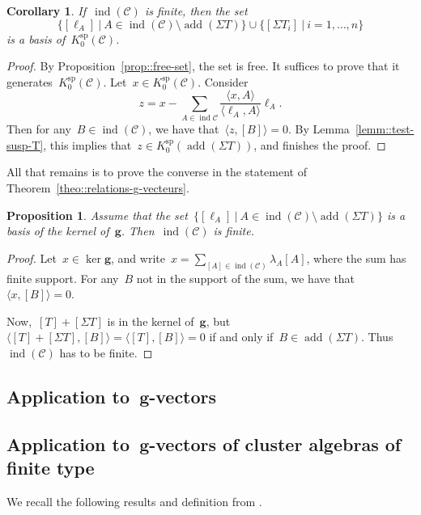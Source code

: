 \documentclass{amsart}
\newtheorem{corollary}[theorem]{Corollary}
\newtheorem{proposition}[theorem]{Proposition}
\theoremstyle{definition}
\renewcommand{\b}[1]{{\boldsymbol{#1}}} %
\newcommand{\cat}{\mathcal{C}}
\newcommand{\susp}{\Sigma}
\newcommand{\add}{\operatorname{add}}
\newcommand{\spl}{\operatorname{sp}}
\newcommand{\Ksp}{K_0^{\spl}}
\newcommand{\ind}{\operatorname{ind}}
\begin{document}
\begin{corollary}
 If~$\ind(\cat)$ is finite, then the set~\[\{[\ell_A] \ | \ A\in \ind(\cat) \setminus \add(\susp T) \} \cup \{[\susp T_i] \ | \ i=1, \ldots, n\}\] is a basis of~$\Ksp(\cat)$.
\end{corollary}
\begin{proof}
 By Proposition~\ref{prop::free-set}, the set is free.  It suffices to prove that it generates~$\Ksp(\cat)$.  Let~$x\in \Ksp(\cat)$.  Consider
 \[
  z = x - \sum_{A\in \ind{\cat}} \frac{\langle x, A \rangle}{\langle \ell_A, A\rangle} \ell_A.
 \]
 Then for any~$B\in \ind(\cat)$, we have that~$\langle z, [B] \rangle = 0$.  By Lemma~\ref{lemm::test-susp-T}, this implies that~$z\in \Ksp(\add(\susp T))$, and finishes the proof.
\end{proof}


All that remains is to prove the converse in the statement of Theorem~\ref{theo::relations-g-vecteurs}.

\begin{proposition}
 Assume that the set~$\{[\ell_A] \ | \ A\in \ind(\cat) \setminus \add(\susp T) \}$ is a basis of the kernel of~$\b g$. Then~$\ind(\cat)$ is finite.
\end{proposition}
\begin{proof}
 Let~$x\in \ker \b g$, and write~$x = \sum_{[A]\in \ind(\cat)} \lambda_A[A]$, where the sum has finite support.  For any~$B$ not in the support of the sum, we have that~$\langle x, [B] \rangle = 0$.
 
 Now,~$[T]+[\susp T]$ is in the kernel of~$\b g$, but~$\langle [T] + [\susp T], [B] \rangle = \langle [T], [B] \rangle = 0$ if and only if~$B\in \add(\susp T)$.  Thus~$\ind(\cat)$ has to be finite.
\end{proof}


\subsection{Application to~$\b g$-vectors}\label{sect::applications-g-vectors}

\subsection{Application to~$\b g$-vectors of cluster algebras of finite type}\label{sect::applications-g-vectors}

We recall the following results and definition from \cite{DehyKeller,Palu}.
\end{document}
